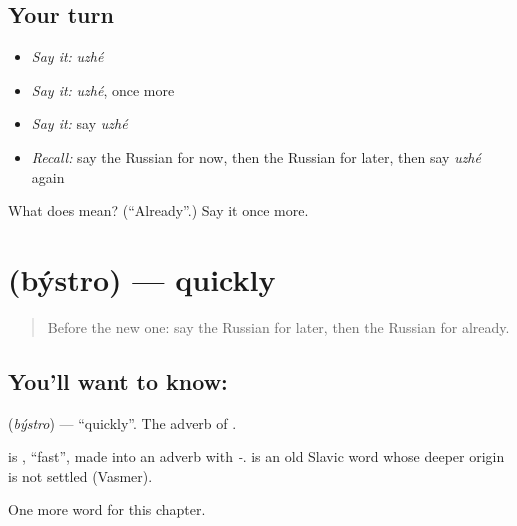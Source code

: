 \subsection*{Your turn}
\begin{itemize}
\raggedright
  \item \emph{Say it:} \emph{uzhé}
  \item \emph{Say it:} \emph{uzhé}, once more
  \item \emph{Say it:} say \emph{uzhé}
  \item \emph{Recall:} say the Russian for now, then the Russian for later, then say \emph{uzhé} again
\end{itemize}

\begin{tcolorbox}[breakable,colback=teal!4,colframe=teal!35!black,title={Before you move on}]
What does  mean? (\textquotedblleft{}Already\textquotedblright{}.) Say it once more.
\end{tcolorbox}
\section[\texorpdfstring{\ru{быстро} (býstro)}{быстро (býstro)}]{ (býstro) — quickly}

\label{lesson:RU-C75-quickly}



\begin{quote}
Before the new one: say the Russian for later, then the Russian for already.
\end{quote}

\subsection*{You'll want to know: }
\textbf{} (\emph{býstro}) — \textquotedblleft{}quickly\textquotedblright{}. The adverb of \textbf{}.

\begin{cousinweb}
\textbf{} is \emph{}, \textquotedblleft{}fast\textquotedblright{}, made into an adverb with \emph{-}. \emph{} is an old Slavic word whose deeper origin is not settled (Vasmer).
\end{cousinweb}

\begin{grammarlens}[title={What you've built}]
One more word for this chapter.
\end{grammarlens}

